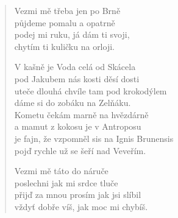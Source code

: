 \begin{multicols}{2}
\begin{verse}
Vezmi mě třeba jen po Brně\\
půjdeme pomalu a opatrně\\
podej mi ruku, já dám ti svoji,\\
chytím ti kuličku na orloji.

V kašně je Voda celá od Skácela\\
pod Jakubem nás kosti děsí dosti\\
uteče dlouhá chvíle tam pod krokodýlem\\
dáme si do zobáku na Zelňáku.\\
Kometu čekám marně na hvězdárně\\
a mamut z kokosu je v Antroposu\\
je fajn, že vzpomněl sis na Ignis Brunensis\\
pojď rychle už se šeří nad Veveřím.

Vezmi mě táto do náruče\\
poslechni jak mi srdce tluče\\
přijď za mnou prosím jak jsi slíbil\\
vždyť dobře víš, jak moc mi chybíš.

\end{verse}
\end{multicols}
